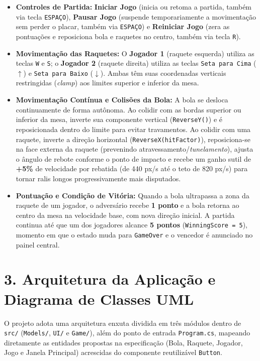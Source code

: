 \documentclass[10pt,a4paper]{article}
\begin{document}
\begin{itemize}
    \item \textbf{Controles de Partida:} \textbf{Iniciar Jogo} (inicia ou retoma a partida, também via tecla \texttt{ESPAÇO}), \textbf{Pausar Jogo} (suspende temporariamente a movimentação sem perder o placar, também via \texttt{ESPAÇO}) e \textbf{Reiniciar Jogo} (zera as pontuações e reposiciona bola e raquetes no centro, também via tecla \texttt{R}).
    \item \textbf{Movimentação das Raquetes:} O \textbf{Jogador 1} (raquete esquerda) utiliza as teclas \texttt{W} e \texttt{S}; o \textbf{Jogador 2} (raquete direita) utiliza as teclas \texttt{Seta para Cima} ($\uparrow$) e \texttt{Seta para Baixo} ($\downarrow$). Ambas têm suas coordenadas verticais restringidas (\textit{clamp}) aos limites superior e inferior da mesa.
    \item \textbf{Movimentação Contínua e Colisões da Bola:} A bola se desloca continuamente de forma autônoma. Ao colidir com as bordas superior ou inferior da mesa, inverte sua componente vertical (\texttt{ReverseY()}) e é reposicionada dentro do limite para evitar travamentos. Ao colidir com uma raquete, inverte a direção horizontal (\texttt{ReverseX(hitFactor)}), reposiciona-se na face externa da raquete (prevenindo atravessamento/\textit{tunelamento}), ajusta o ângulo de rebote conforme o ponto de impacto e recebe um ganho sutil de \textbf{+5\%} de velocidade por rebatida (de 440 px/s até o teto de 820 px/s) para tornar ralis longos progressivamente mais disputados.
    \item \textbf{Pontuação e Condição de Vitória:} Quando a bola ultrapassa a zona da raquete de um jogador, o adversário recebe \textbf{1 ponto} e a bola retorna ao centro da mesa na velocidade base, com nova direção inicial. A partida continua até que um dos jogadores alcance \textbf{5 pontos} (\texttt{WinningScore = 5}), momento em que o estado muda para \texttt{GameOver} e o vencedor é anunciado no painel central.
\end{itemize}

\newpage
\section*{3. Arquitetura da Aplicação e Diagrama de Classes UML}
O projeto adota uma arquitetura enxuta dividida em três módulos dentro de \texttt{src/} (\texttt{Models/}, \texttt{UI/} e \texttt{Game/}), além do ponto de entrada \texttt{Program.cs}, mapeando diretamente as entidades propostas na especificação (Bola, Raquete, Jogador, Jogo e Janela Principal) acrescidas do componente reutilizável \texttt{Button}.
\end{document}
